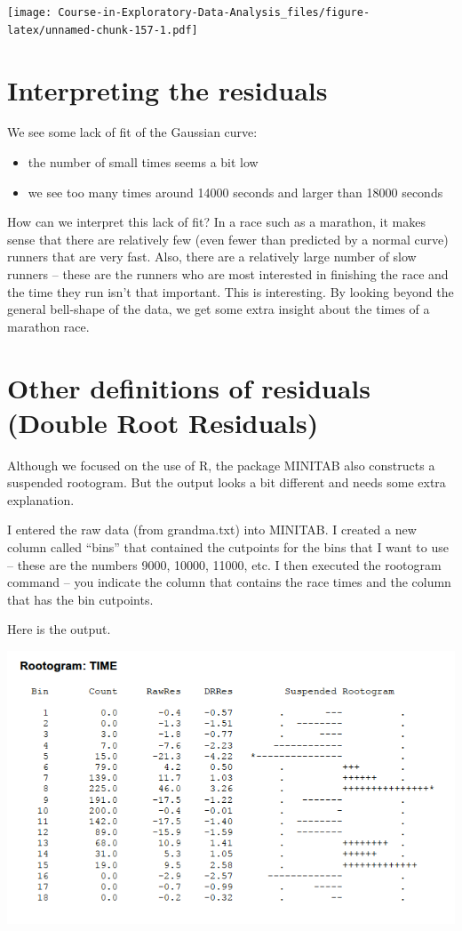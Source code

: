 \documentclass[
]{book}
\providecommand{\tightlist}{%
  \setlength{\itemsep}{0pt}\setlength{\parskip}{0pt}}
\begin{document}
\texttt{[image: Course-in-Exploratory-Data-Analysis\_files/figure-latex/unnamed-chunk-157-1.pdf]}

\hypertarget{interpreting-the-residuals-1}{%
\section{Interpreting the residuals}\label{interpreting-the-residuals-1}}

We see some lack of fit of the Gaussian curve:

\begin{itemize}
\tightlist
\item
  the number of small times seems a bit low
\item
  we see too many times around 14000 seconds and larger than 18000 seconds
\end{itemize}

How can we interpret this lack of fit? In a race such as a marathon, it makes sense that there are relatively few (even fewer than predicted by a normal curve) runners that are very fast. Also, there are a relatively large number of slow runners -- these are the runners who are most interested in finishing the race and the time they run isn't that important. This is interesting. By looking beyond the general bell-shape of the data, we get some extra insight about the times of a marathon race.

\hypertarget{other-definitions-of-residuals-double-root-residuals}{%
\section{Other definitions of residuals (Double Root Residuals)}\label{other-definitions-of-residuals-double-root-residuals}}

Although we focused on the use of R, the package MINITAB also constructs a suspended rootogram. But the output looks a bit different and needs some extra explanation.

I entered the raw data (from grandma.txt) into MINITAB. I created a new column called ``bins'' that contained the cutpoints for the bins that I want to use -- these are the numbers 9000, 10000, 11000, etc. I then executed the rootogram command -- you indicate the column that contains the race times and the column that has the bin cutpoints.

Here is the output.

\includegraphics{figures/binning/minitabrootogram.png}
\end{document}

